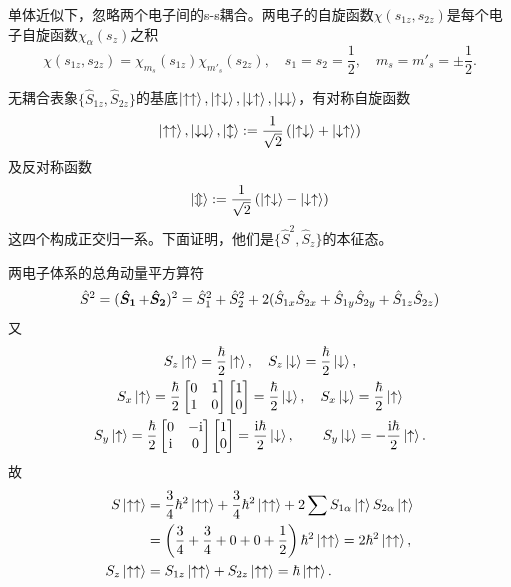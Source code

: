 单体近似下，忽略两个电子间的s-s耦合。两电子的自旋函数$\chi(s_{1z},s_{2z})$是每个电子自旋函数$\chi_\alpha(s_z)$之积
\[
	\chi(s_{1z},s_{2z})=\chi_{m_s}(s_{1z})\chi_{m'_s}(s_{2z}),\quad s_1=s_2=\frac12,\quad m_s=m'_s=\pm\frac12.
\]

无耦合表象$\{\hat S_{1z},\hat S_{2z}\}$的基底$\left\vert \uparrow\uparrow\right\rangle,\left\vert \uparrow\downarrow\right\rangle,\left\vert \downarrow\uparrow\right\rangle,\left\vert \downarrow\downarrow\right\rangle$，有对称自旋函数
\[
	\left\vert \uparrow\uparrow\right\rangle,\left\vert \downarrow\downarrow\right\rangle,\left\vert \updownarrow\right\rangle:=\frac1{\sqrt2}\left(\left\vert \uparrow\downarrow\right\rangle+\left\vert \downarrow\uparrow\right\rangle\right)
\]
及反对称函数
\[
	\left\vert \Updownarrow\right\rangle :=\frac1{\sqrt2}\left(\left\vert \uparrow\downarrow\right\rangle-\left\vert \downarrow\uparrow\right\rangle\right)
\]
这四个构成正交归一系。下面证明，他们是$\{\hat S^2,\hat S_z\}$的本征态。

两电子体系的总角动量平方算符
\begin{align*}
	\hat S^2=(\bm{\hat S_1}\!\mathop{}+\bm{\hat S_2}\!\mathop{})^2=\hat S_1^2+\hat S_2^2+2(\hat S_{1x}\hat S_{2x}+\hat S_{1y}\hat S_{2y}+\hat S_{1z}\hat S_{2z})
\end{align*}
又
\begin{gather*}
	S_z\left\vert \uparrow\right\rangle=\frac\hbar{2}\left\vert \uparrow\right\rangle,\quad S_z\left\vert \downarrow\right\rangle=\frac\hbar{2}\left\vert \downarrow\right\rangle,\\
	S_x\left\vert \uparrow\right\rangle=\frac\hbar{2}\begin{bmatrix}0&1\\1&0\end{bmatrix}\begin{bmatrix}1\\0\end{bmatrix}=\frac\hbar{2}\left\vert \downarrow\right\rangle,\quad S_x\left\vert \downarrow\right\rangle=\frac\hbar{2}\left\vert \uparrow\right\rangle\\
	S_y\left\vert \uparrow\right\rangle=\frac\hbar{2}\begin{bmatrix}0&-\mathrm{i}\\\mathrm{i}&0\end{bmatrix}\begin{bmatrix}1\\0\end{bmatrix}=\frac{\mathrm{i}\hbar}{2}\left\vert \downarrow\right\rangle,\quad \quad S_y\left\vert \downarrow\right\rangle=-\frac{\mathrm{i}\hbar}{2}\left\vert \uparrow\right\rangle.
\end{gather*}
故
\begin{align*}
	S\left\vert \uparrow\uparrow\right\rangle&=\frac34\hbar^2\left\vert \uparrow\uparrow\right\rangle+\frac34\hbar^2\left\vert \uparrow\uparrow\right\rangle+2\sum S_{1\alpha}\left\vert \uparrow\right\rangle S_{2\alpha}\left\vert \uparrow\right\rangle\\
	&=\left(\frac34+\frac34+0+0+\frac12\right)\hbar^2\left\vert \uparrow\uparrow\right\rangle=2\hbar^2\left\vert \uparrow\uparrow\right\rangle,\\
	S_z\left\vert \uparrow\uparrow\right\rangle&=S_{1z}\left\vert \uparrow\uparrow\right\rangle+S_{2z}\left\vert \uparrow\uparrow\right\rangle=\hbar\left\vert \uparrow\uparrow\right\rangle.
\end{align*}

